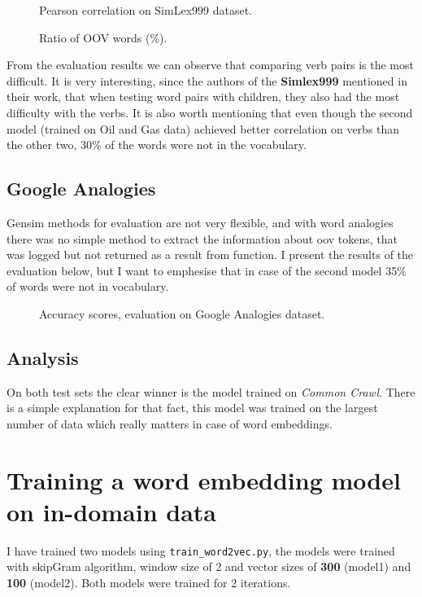 \documentclass{article}
\begin{document}
\begin{figure}[h]
	\centering
	
	\caption{Pearson correlation on SimLex999 dataset.}
\end{figure}
\begin{figure}[h]
	\centering
	
	\caption{Ratio of OOV words (\%).}
\end{figure}

From the evaluation results we can observe that comparing verb pairs is the most difficult.
It is very interesting, since the authors of the \textbf{Simlex999} mentioned in their work,
that when testing word pairs with children, they also had the most difficulty with the verbs.
It is also worth mentioning that even though the second model (trained on Oil and Gas data)
achieved better correlation on verbs than the other two, 30\% of the words were not in the vocabulary.

\subsection{Google Analogies}
Gensim methods for evaluation are not very flexible, and with word analogies
there was no simple method to extract the information about oov tokens, that was logged but not
returned as a result from function. I present the results of the evaluation below, but
I want to emphesise that in case of the second model 35\% of words were not in vocabulary.

\begin{figure}[h]
	\centering
	
	\caption{Accuracy scores, evaluation on Google Analogies dataset.}
\end{figure}


\subsection{Analysis}
On both test sets the clear winner is the model trained on \textit{Common Crawl}. There is a
simple explanation for that fact, this model was trained on the largest number of data which really
matters in case of word embeddings. 

\section{ Training a word embedding model on in-domain data}
I have trained two models using \lstinline{train_word2vec.py}, the models were trained
with skipGram algorithm, window size of 2 and vector sizes of \textbf{300} (model1) and \textbf{100} (model2).
Both models were trained for 2 iterations.
\end{document}
